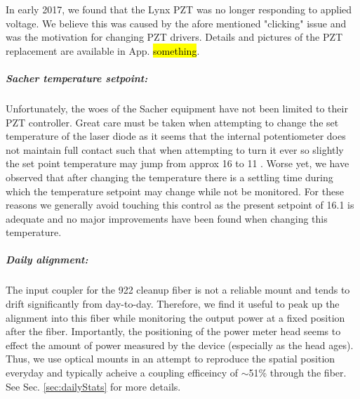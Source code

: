 In early 2017, we found that the Lynx PZT was no longer responding to applied voltage.
We believe this was caused by the afore mentioned "clicking" issue and was the motivation for changing PZT drivers.
Details and pictures of the PZT replacement are available in App. \hl{something}.

\subparagraph{Sacher temperature setpoint:}
Unfortunately, the woes of the Sacher equipment have not been limited to their PZT controller.
Great care must be taken when attempting to change the set temperature of the laser diode as it seems that the internal potentiometer does not maintain full contact such that when attempting to turn it ever so slightly the set point temperature may jump from approx 16 \degreeC to 11 \degreeC.
Worse yet, we have observed that after changing the temperature there is a settling time during which the temperature setpoint may change while not be monitored.
For these reasons we generally avoid touching this control as the present setpoint of 16.1 \degreeC is adequate and no major improvements have been found when changing this temperature.

\subparagraph{Daily alignment:}
The input coupler for the 922 cleanup fiber is not a reliable mount and tends to drift significantly from day-to-day.
Therefore, we find it useful to peak up the alignment into this fiber while monitoring the output power at a fixed position after the fiber.
Importantly, the positioning of the power meter head seems to effect the amount of power measured by the device (especially as the head ages).
Thus, we use optical mounts in an attempt to reproduce the spatial position everyday and typically acheive a coupling efficeincy of $\sim$51\% through the fiber.
See Sec. \ref{sec:dailyStats} for more details.
		
